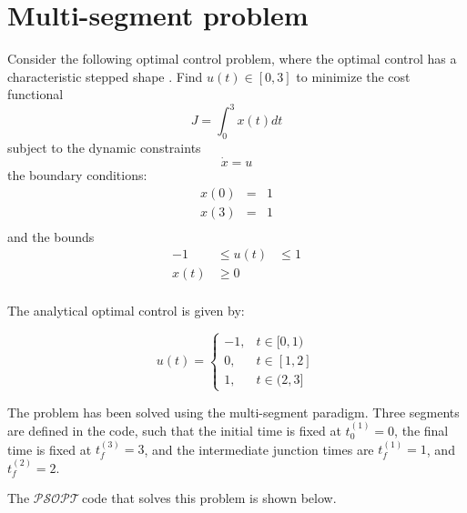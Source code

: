 \documentclass[a4paper,11pt]{report}    %
\newcommand{\psopt}{$\mathcal{PSOPT}$\,}  %
\newenvironment{shadedframe}{%
  \def\FrameCommand{\fcolorbox{black}{shadecolor}}%
  \MakeFramed {\FrameRestore}}
{\endMakeFramed}
\begin{document}
\section{Multi-segment problem} \label{example:multi-segment}

Consider the following optimal control problem, where the optimal control has a
characteristic stepped shape \cite{Gong:08}.  Find $u(t) \in [0, 3]$ 
to minimize the cost functional
\begin{equation}
  J = \int_{0}^{3} x(t) dt
\end{equation}
subject to the dynamic constraints
\begin{equation}
   \dot x = u
\end{equation}
the boundary conditions:
 \begin{equation}
  \begin{array}{lcl}
   x(0) &=& 1 \\
   x(3) &=& 1\\
  \end{array}
\end{equation}
and the bounds 
\begin{equation}
\begin{aligned}
  -1  &\le u(t) &\le 1 \\
   x(t) &\ge 0 \\
\end{aligned}
\end{equation}

The analytical optimal control is given by:

\begin{equation}
   u(t) = \left\{ \begin{array}{ll}  
                   -1, & t \in [0,1) \\
                    0, & t \in [1,2] \\
                    1, & t \in (2,3]
                  \end{array} \right.
\end{equation}


The problem has been solved using the multi-segment paradigm. Three segments are defined in the code, such
that the initial time is fixed at $t_0^{(1)} = 0$, the final time is fixed at $t_f^{(3)} = 3$, and the intermediate 
junction times are $t_f^{(1)} = 1$, and $t_f^{(2)} = 2$.

The
\psopt code that solves this problem is shown below.  

\tiny
\begin{shadedframe}

\end{shadedframe}
\normalsize
\end{document}
